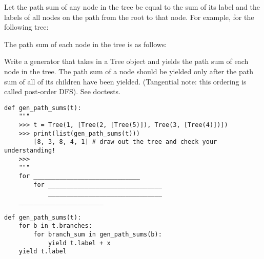 \begin{blocksection}
\question Let the path sum of any node in the tree be equal to the sum of its label and the labels of all nodes on the path from the root to that node. For example, for the following tree:

The path sum of each node in the tree is as follows:


Write a generator that takes in a Tree object and yields the path sum of each node in the tree. The path sum of a node should be yielded only after the path sum of all of its children have been yielded. (Tangential note: this ordering is called post-order DFS). See doctests.


\begin{lstlisting}
def gen_path_sums(t):
    """
    >>> t = Tree(1, [Tree(2, [Tree(5)]), Tree(3, [Tree(4)])])
    >>> print(list(gen_path_sums(t)))
       	[8, 3, 8, 4, 1] # draw out the tree and check your understanding!
    >>> 
    """    
    for _____________________________
    	for _______________________________
    		_______________________________
    _______________________
\end{lstlisting}

\begin{solution}[0.5in]
\begin{lstlisting}
def gen_path_sums(t):
    for b in t.branches:
        for branch_sum in gen_path_sums(b):
            yield t.label + x
    yield t.label
\end{lstlisting}

\end{solution}
\end{blocksection}
